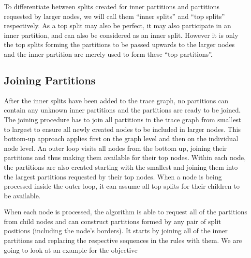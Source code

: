 To differentiate between splits created for inner partitions and partitions requested by larger nodes, we will call them ``inner splits'' and ``top splits'' respectively. As a top split may also be perfect, it may also participate in an inner partition, and can also be considered as an inner split. However it is only the top splits forming the partitions to be passed upwards to the larger nodes and the inner partition are merely used to form these ``top partitions''.

\subsection{Joining Partitions}

After the inner splits have been added to the trace graph, no partitions can contain any unknown inner partitions and the partitions are ready to be joined. The joining procedure has to join all partitions in the trace graph from smallest to largest to ensure all newly created nodes to be included in larger nodes. This bottom-up approach applies first on the graph level and then on the individual node level. An outer loop visits all nodes from the bottom up, joining their partitions and thus making them available for their top nodes. Within each node, the partitions are also created starting with the smallest and joining them into the largest partitions requested by their top nodes. When a node is being processed inside the outer loop, it can assume all top splits for their children to be available.
\newpage

%

\begin{samepage}
\noindent When each node is processed, the algorithm is able to request all of the partitions from child nodes and can construct partitions formed by any pair of split positions (including the node's borders). It starts by joining all of the inner partitions and replacing the respective sequences in the rules with them. We are going to look at an example for the objective
\end{samepage}

